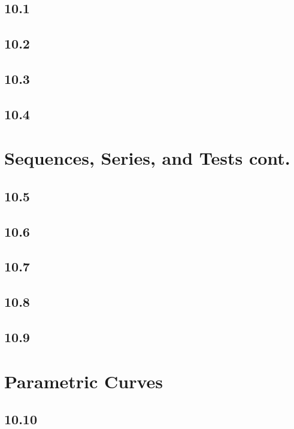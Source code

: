 \documentclass{article}
\begin{document}
        \subsection*{10.1}
        \subsection*{10.2}
        \subsection*{10.3}
        \subsection*{10.4}
    \section{Sequences, Series, and Tests cont.}
        \subsection*{10.5}
        \subsection*{10.6}
        \subsection*{10.7}
        \subsection*{10.8}
        \subsection*{10.9}
    \section{Parametric Curves}
        \subsection*{10.10}
        \color{OliveGreen}
\end{document}
